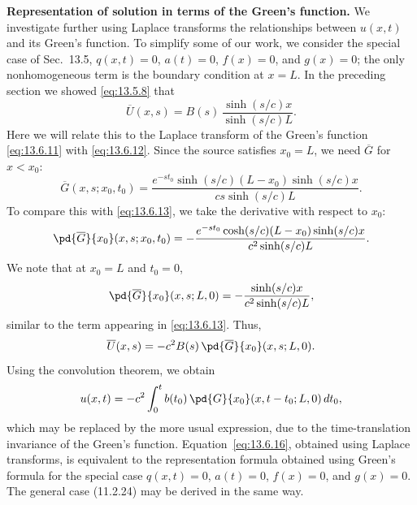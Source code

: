 \textbf{Representation of solution in terms of the Green's function.}
We investigate further using Laplace transforms the relationships between $u(x,t)$ and its Green's function.  To simplify some of our work, we consider the special case of Sec.~13.5, $q(x,t)=0$, $a(t)=0$, $f(x)=0$, and $g(x)=0$; the only nonhomogeneous term is the boundary condition at $x=L$.  In the preceding section we showed \eqref{eq:13.5.8} that
\begin{equation}
\overline{U}(x,s) = B(s)\,\frac{\sinh(s/c)x}{\sinh(s/c)L}.
\label{eq:13.6.13}
\end{equation}
Here we will relate this to the Laplace transform of the Green's function \eqref{eq:13.6.11} with \eqref{eq:13.6.12}.  Since the source satisfies $x_0 = L$, we need $\overline{G}$ for $x < x_0$:
\begin{equation}
\overline{G}(x,s;x_0,t_0) = \frac{e^{-st_0}\sinh(s/c)(L-x_0)\sinh(s/c)x}{cs\sinh(s/c)L}.
\label{eq:13.6.14}
\end{equation}
To compare this with \eqref{eq:13.6.13}, we take the derivative with respect to $x_0$:
\[
\pd{\overline{G}}{x_0}(x,s;x_0,t_0)
= -\frac{e^{-st_0}\cosh(s/c)(L-x_0)\sinh(s/c)x}{c^2\sinh(s/c)L}.
\]
We note that at $x_0 = L$ and $t_0 = 0$,
\begin{equation}
\pd{\overline{G}}{x_0}(x,s;L,0)
= -\frac{\sinh(s/c)x}{c^2\sinh(s/c)L},
\label{eq:13.6.15}
\end{equation}
similar to the term appearing in \eqref{eq:13.6.13}.  Thus,
\[
\overline{U}(x,s) = -c^2 B(s)\,\pd{\overline{G}}{x_0}(x,s;L,0).
\]
Using the convolution theorem, we obtain
\[
u(x,t) = -c^2\int_0^t b(t_0)\,\pd{G}{x_0}(x,t-t_0;L,0)\,dt_0,
\]
which may be replaced by the more usual expression,
due to the time-translation invariance of the Green's function.  Equation~\eqref{eq:13.6.16}, obtained using Laplace transforms, is equivalent to the representation formula obtained using Green's formula for the special case $q(x,t) = 0$, $a(t) = 0$, $f(x) = 0$, and $g(x) = 0$.  The general case (11.2.24) may be derived in the same way.

